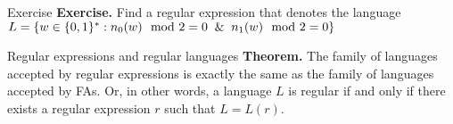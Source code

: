 \documentclass[10pt]{beamer}
\begin{document}
\begin{frame}[t]{Exercise}
    \textbf{Exercise.} Find a regular expression that denotes the language $L = \{w \in \{0,1\}^* : n_0(w) \mod 2 = 0 \And n_1(w) \mod 2 = 0\}$
\end{frame}

\begin{frame}{Regular expressions and regular languages}
    \textbf{Theorem.} The family of languages accepted by regular expressions is exactly the same as the family of languages accepted by FAs. Or, in other words, a language $L$ is regular if and only if there exists a regular expression $r$ such that $L = L(r)$.
\end{frame}
\end{document}
